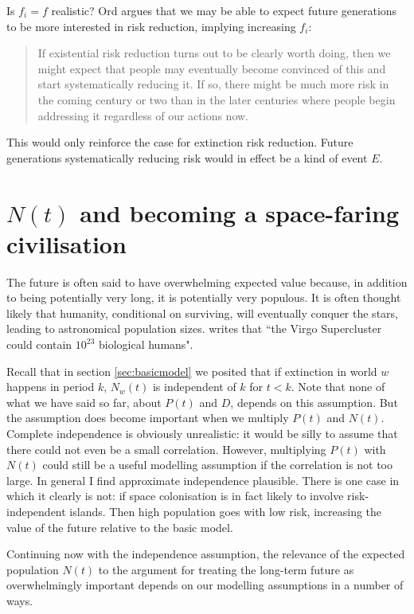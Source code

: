 \documentclass[british]{article}
\begin{document}
Is $f_i = f$ realistic? Ord argues that we may be able to expect future generations to be more interested in risk reduction, implying increasing $f_i$:
\begin{quote}
If existential risk reduction turns out to be clearly worth doing, then we might expect that people may eventually become convinced of this and start systematically reducing it. If so, there might be much more risk in the coming century or two than in the later centuries where people begin addressing it regardless of our actions now.
\end{quote}
This would only reinforce the case for extinction risk reduction. Future generations systematically reducing risk would in effect be a kind of event $E$.

\section{$N(t)$ and becoming a space-faring civilisation}\label{nt}
The future is often said to have overwhelming expected value because, in
addition to being potentially very long, it is potentially very populous. It is often thought likely that humanity, conditional on surviving, will eventually conquer the stars, leading to astronomical population sizes. \cite{ba} writes that ``the Virgo Supercluster could contain $10^{23}$ biological humans".

Recall that in section \ref{sec:basicmodel} we posited that if extinction in world $w$ happens in period $k$, $N_w(t)$ is independent of $k$ for $t<k$. Note that none of what we have said so far, about $P(t)$ and $D$, depends on this assumption. But the assumption does become important when we multiply $P(t)$ and $N(t)$. Complete independence is obviously unrealistic: it would be silly to assume that there could not even be a small correlation. However, multiplying $P(t)$ with $N(t)$ could still be a useful modelling assumption if the correlation is not too large. In general I find approximate independence plausible. There is one case in which it clearly is not: if space colonisation is in fact likely to involve risk-independent islands. Then high population goes with low risk, increasing the value of the future relative to the basic model.

Continuing now with the independence assumption, the relevance of the expected population $N(t)$ to the argument for treating the long-term future as overwhelmingly important depends on our modelling assumptions in a number of ways.
\end{document}
